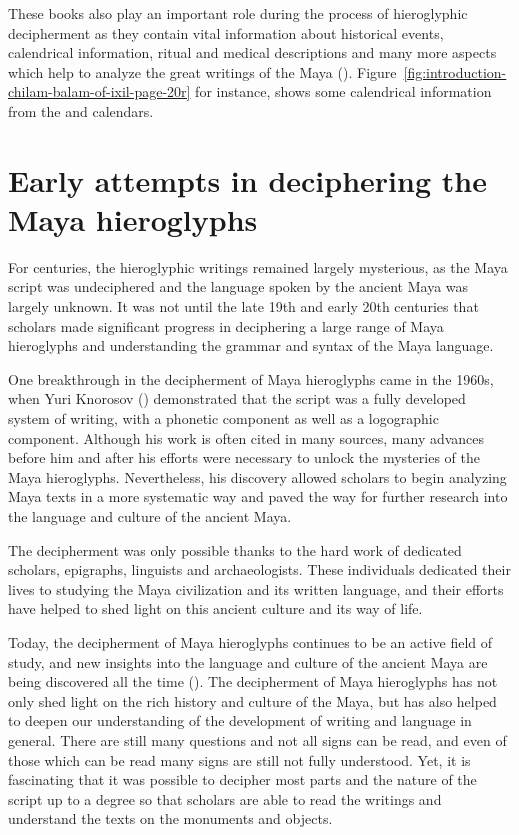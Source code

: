 \documentclass[../main.tex]{subfiles}
\begin{document}
These books also play an important role during the process of hieroglyphic decipherment as they 
contain vital information about historical events, calendrical information, ritual and 
medical descriptions and many more aspects which help to analyze the great writings of the 
Maya (\cite[3\psq]{roys1933}).
Figure~\ref{fig:introduction-chilam-balam-of-ixil-page-20r} for instance, shows some 
calendrical information from the \tzolkin and \haab calendars.

\section{Early attempts in deciphering the Maya hieroglyphs}
For centuries, the hieroglyphic writings remained largely mysterious, as the Maya script was 
undeciphered and the language spoken by the ancient Maya was largely unknown.
It was not until the late 19th and early 20th centuries that scholars made significant progress 
in deciphering a large range of Maya hieroglyphs and understanding the grammar and syntax of 
the Maya language. 

One breakthrough in the decipherment of Maya hieroglyphs came in the 1960s, 
when Yuri Knorosov (\cite{knorozov1967}) demonstrated that the script was a fully developed 
system of writing, with a phonetic component as well as a logographic component. 
Although his work is often cited in many sources, many advances before him and after his efforts
were necessary to unlock the mysteries of the Maya hieroglyphs.
Nevertheless, his discovery allowed scholars to begin analyzing Maya texts in a more systematic 
way and paved the way for further research into the language and culture of the ancient Maya.

The decipherment was only possible thanks to the hard work of dedicated scholars, epigraphs, 
linguists and archaeologists. 
These individuals dedicated their lives to studying the Maya civilization and its written 
language, and their efforts have helped to shed light on this ancient culture and its way of life. 

Today, the decipherment of Maya hieroglyphs continues to be an active field of study, 
and new insights into the language and culture of the ancient Maya are being discovered 
all the time (\cite{zender2017}). 
The decipherment of Maya hieroglyphs has not only shed light on the rich history and culture of 
the Maya, but has also helped to deepen our understanding of the development of writing and 
language in general.
There are still many questions and not all signs can be read, and even of those which can be read
many signs are still not fully understood.
Yet, it is fascinating that it was possible to decipher most parts
and the nature of the script up to a degree so that scholars are able to read the writings and 
understand the texts on the monuments and objects.
\end{document}
